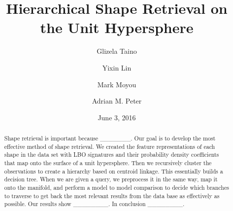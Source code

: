 \documentclass{article}
\begin{document}
\title{Hierarchical Shape Retrieval on the Unit Hypersphere}
\author{Glizela Taino}
\author{Yixin Lin}
\author{Mark Moyou}
\author{Adrian M. Peter}
\setcounter{Maxaffil}{0}
\renewcommand\Affilfont{\itshape\small}
\date{June 3, 2016}
\maketitle

\begin{abstract}
Shape retrieval is important because \_\_\_\_\_\_\_. Our goal is to
develop the most effective method of shape retrieval. We created the
feature representations of each shape in the data set with LBO signatures
and their probability density coefficients that map onto the surface
of a unit hypersphere. Then we recursively cluster the observations
to create a hierarchy based on centroid linkage. This essentially
builds a decision tree. When we are given a query, we preprocess it
in the same way, map it onto the manifold, and perform a model to
model comparison to decide which branches to traverse to get back
the most relevant results from the data base as effectively as possible.
Our results show \_\_\_\_\_\_\_\_. In conclusion \_\_\_\_\_\_\_\_.\end{abstract}








\newpage


\end{document}
